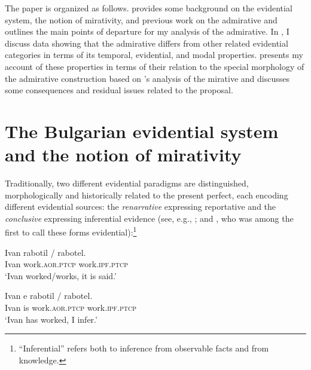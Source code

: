 \documentclass[output=paper,
colorlinks,
citecolor=brown,
newtxmath
]{langscibook}
\begin{document}
The paper is organized as follows.  provides some background on the  evidential system, the notion of mirativity, and previous work on the  admirative and outlines the main points of departure for my analysis of the admirative. In , I discuss data showing that the  admirative differs from other related evidential categories in terms of its temporal, evidential, and modal properties.  presents my account of these properties in terms of their relation to the special morphology of the admirative construction based on \citeauthor{Bustamante2013}'s analysis of the  mirative and  discusses some consequences and residual issues related to the proposal.




\section{The Bulgarian evidential system and the notion of mirativity}\label{sec:BG_evid_syst}

Traditionally, two different evidential paradigms are distinguished, morphologically and historically \citep[see][]{Andrejcin1944,Aronson1967}
related to the present perfect, each encoding different evidential sources: the \textit{renarrative} expressing reportative  and the \textit{conclusive} expressing inferential  evidence (see, e.g., \citealt{Bojadziev.etal1999,Pasov1999,Nicolova2008}; and \citealt{Jacobson1971}, who was among the first to call these forms evidential):\footnote{``Inferential'' refers both to inference from observable facts and from knowledge. %
}

\ea\label{report}
\gll Ivan rabotil / rabotel. \\
Ivan work.\textsc{aor.ptcp} {} work.\textsc{ipf.ptcp} \\
\glt `Ivan worked/works, it is said.'
\z

\ea \label{concl}
\gll Ivan e rabotil / rabotel. \\
 Ivan is work.\textsc{aor.ptcp} {} work.\textsc{ipf.ptcp}\\
\glt `Ivan has worked, I infer.'
\z
\end{document}
